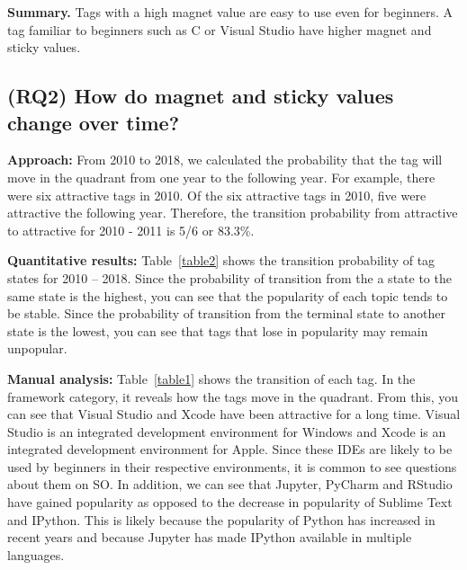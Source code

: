 \documentclass[conference]{IEEEtran}
\begin{document}
\noindent \textbf{Summary.}
 Tags with a high magnet value are easy to use even for beginners. A tag familiar to beginners such as C or Visual Studio have higher magnet and sticky values.

\subsection{(RQ2) How do magnet and sticky values change over time?} 

\noindent \textbf{Approach:}
From 2010 to 2018, we calculated the probability that the tag will move in the quadrant from one year to the following year. For example, there were six attractive tags in 2010. Of the six attractive tags in 2010, five were attractive the following year. Therefore, the transition probability from attractive to attractive for 2010 - 2011 is 5/6 or 83.3\%. 

\noindent \textbf{Quantitative results:}
Table~\ref{table2} shows the transition probability of tag states for 2010 -- 2018.
Since the probability of transition from the a state to the same state is the highest, you can see that the popularity of each topic tends to be stable.
Since the probability of transition from the terminal state to another state is the lowest, you can see that tags that lose in popularity may remain unpopular.

\noindent \textbf{Manual analysis:}
Table~\ref{table1} shows the transition of each tag. In the framework category, it reveals how the tags move in the quadrant. From this, you can see that Visual Studio\cite{johnson2012professional} and Xcode\cite{tisato1984xcode} have been attractive for a long time. Visual Studio is an integrated development environment for Windows and Xcode is an integrated development environment for Apple. Since these IDEs are likely to be used by beginners in their respective environments, it is common to see questions about them on SO. In addition, we can see that Jupyter\cite{perkel2018jupyter}, PyCharm\cite{islam2015mastering} and RStudio\cite{allaire2012rstudio} have gained popularity as opposed to the decrease in popularity of Sublime Text\cite{peleg2013mastering} and IPython\cite{perez2007ipython}. This is likely because the popularity of Python has increased in recent years and because Jupyter has made IPython available in multiple languages.
\end{document}
